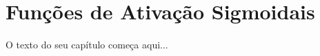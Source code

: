 
\chapter{Funções de Ativação Sigmoidais}
\label{cap:ativacao-sigmoidais}

O texto do seu capítulo começa aqui...